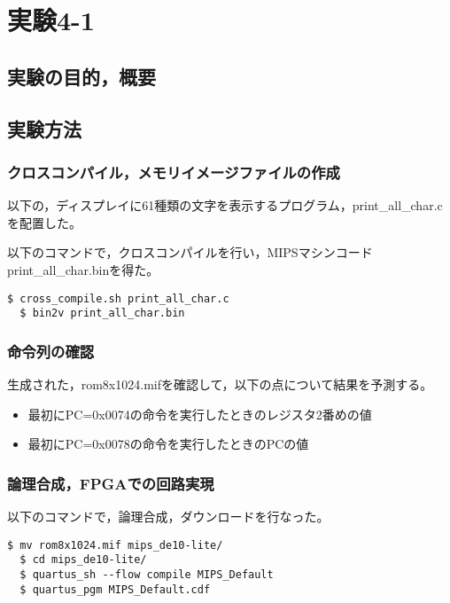 \section{実験4-1}
\subsection{実験の目的，概要}

\subsection{実験方法}
\subsubsection{クロスコンパイル，メモリイメージファイルの作成}
以下の，ディスプレイに61種類の文字を表示するプログラム，print\_all\_char.cを配置した。


以下のコマンドで，クロスコンパイルを行い，MIPSマシンコードprint\_all\_char.binを得た。
\begin{lstlisting}[caption={クロスコンパイル，メモリイメージファイルの作成},label={クロスコンパイル，イメージファイルの作成4-1}]
  $ cross_compile.sh print_all_char.c
  $ bin2v print_all_char.bin
\end{lstlisting}

\subsubsection{命令列の確認}
生成された，rom8x1024.mifを確認して，以下の点について結果を予測する。
\begin{itemize}
  \item 最初にPC=0x0074の命令を実行したときのレジスタ2番めの値
  \item 最初にPC=0x0078の命令を実行したときのPCの値
\end{itemize}

\subsubsection{論理合成，FPGAでの回路実現}
以下のコマンドで，論理合成，ダウンロードを行なった。
\begin{lstlisting}[caption={論理合成，ダウンロード},label={論理合成，ダウンロード4-1}]
  $ mv rom8x1024.mif mips_de10-lite/
  $ cd mips_de10-lite/
  $ quartus_sh --flow compile MIPS_Default
  $ quartus_pgm MIPS_Default.cdf
\end{lstlisting}

